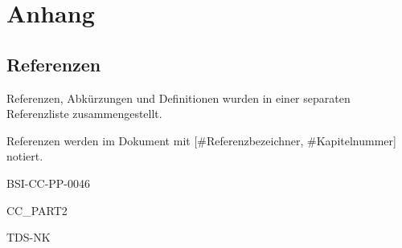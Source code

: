 
\hypertarget{anhang}{\section{Anhang}\label{anhang}}

\hypertarget{referenzen}{\subsection{Referenzen}\label{referenzen}}

Referenzen, Abkürzungen und Definitionen wurden in einer separaten
Referenzliste zusammengestellt.

Referenzen werden im Dokument mit {[}\#Referenzbezeichner,
\#Kapitelnummer{]} notiert.

BSI-CC-PP-0046

CC\_PART2

TDS-NK



